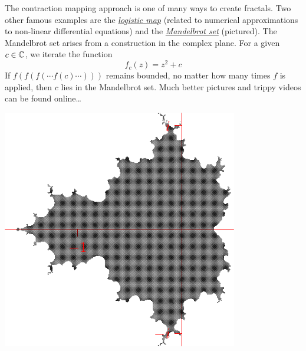 \begin{minipage}[t]{0.63\linewidth}\vspace{0pt}
	
	The contraction mapping approach is one of many ways to create fractals. Two other famous examples are the \href{https://en.wikipedia.org/wiki/Logistic_map}{\emph{logistic map}} (related to numerical approximations to non-linear differential equations) and the \href{https://en.wikipedia.org/wiki/Mandelbrot_set}{\emph{Mandelbrot set}} (pictured).\smallbreak
	The Mandelbrot set arises from a construction in the complex plane. For a given $c\in\mathbb{C}$, we iterate the function
	\[
		f_c(z)=z^2+c
	\]
	If $f(f(f(\cdots f(c)\cdots)))$ remains bounded, no matter how many times $f$ is applied, then $c$ lies in the Mandelbrot set.\smallbreak
	Much better pictures and trippy videos can be found online\ldots
\end{minipage}
\hfill
\begin{minipage}[t]{0.35\linewidth}\vspace{0pt}
	\flushright\includegraphics[scale=0.9]{mandelbrot}
\end{minipage}
\goodbreak



